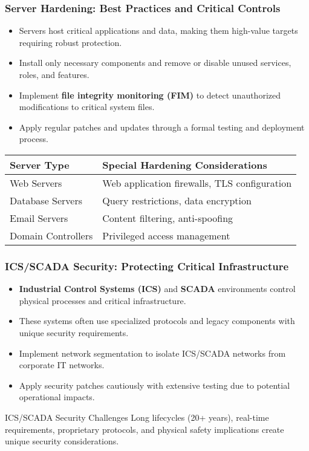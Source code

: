 \documentclass{beamer}
\begin{document}
\begin{frame}
    \frametitle{Server Hardening: Best Practices and Critical Controls}
    
    \begin{itemize}
        \item Servers host critical applications and data, making them high-value targets requiring robust protection.
        \item Install only necessary components and remove or disable unused services, roles, and features.
        \item Implement \textbf{file integrity monitoring (FIM)} to detect unauthorized modifications to critical system files.
        \item Apply regular patches and updates through a formal testing and deployment process.
    \end{itemize}
    
    \begin{table}
        \begin{tabular}{|l|p{5cm}|}
            \hline
            \textbf{Server Type} & \textbf{Special Hardening Considerations} \\
            \hline
            Web Servers & Web application firewalls, TLS configuration \\
            Database Servers & Query restrictions, data encryption \\
            Email Servers & Content filtering, anti-spoofing \\
            Domain Controllers & Privileged access management \\
            \hline
        \end{tabular}
    \end{table}
\end{frame}

\begin{frame}
    \frametitle{ICS/SCADA Security: Protecting Critical Infrastructure}
    
    \begin{itemize}
        \item \textbf{Industrial Control Systems (ICS)} and \textbf{SCADA} environments control physical processes and critical infrastructure.
        \item These systems often use specialized protocols and legacy components with unique security requirements.
        \item Implement network segmentation to isolate ICS/SCADA networks from corporate IT networks.
        \item Apply security patches cautiously with extensive testing due to potential operational impacts.
    \end{itemize}
    
    \begin{block}{ICS/SCADA Security Challenges}
        Long lifecycles (20+ years), real-time requirements, proprietary protocols, and physical safety implications create unique security considerations.
    \end{block}
\end{frame}
\end{document}
